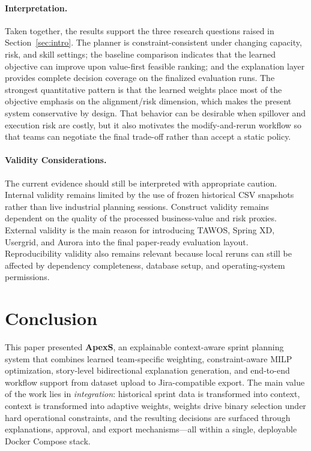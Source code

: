 \documentclass[conference]{IEEEtran}
\begin{document}
\paragraph{Interpretation.}
Taken together, the results support the three research questions raised in
Section~\ref{sec:intro}.
The planner is constraint-consistent under changing capacity, risk, and skill
settings; the baseline comparison indicates that the learned objective can improve
upon value-first feasible ranking; and the explanation layer provides complete
decision coverage on the finalized evaluation runs.
The strongest quantitative pattern is that the learned weights place most of the
objective emphasis on the alignment/risk dimension, which makes the present system
conservative by design.
That behavior can be desirable when spillover and execution risk are costly, but it
also motivates the modify-and-rerun workflow so that teams can negotiate the final
trade-off rather than accept a static policy.

\paragraph{Validity Considerations.}
The current evidence should still be interpreted with appropriate caution.
Internal validity remains limited by the use of frozen historical CSV snapshots
rather than live industrial planning sessions.
Construct validity remains dependent on the quality of the processed business-value
and risk proxies.
External validity is the main reason for introducing TAWOS, Spring XD, Usergrid,
and Aurora into the final paper-ready evaluation layout.
Reproducibility validity also remains relevant because local reruns can still be
affected by dependency completeness, database setup, and operating-system
permissions.

\section{Conclusion}
\label{sec:conclusion}

This paper presented \textbf{ApexS}, an explainable context-aware sprint planning
system that combines learned team-specific weighting, constraint-aware MILP
optimization, story-level bidirectional explanation generation, and end-to-end
workflow support from dataset upload to Jira-compatible export.
%
The main value of the work lies in \emph{integration}: historical sprint data is
transformed into context, context is transformed into adaptive weights, weights
drive binary selection under hard operational constraints, and the resulting
decisions are surfaced through explanations, approval, and export mechanisms---all
within a single, deployable Docker Compose stack.
\end{document}
